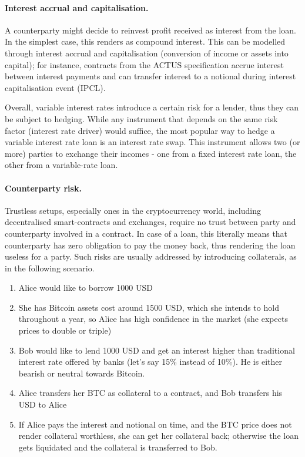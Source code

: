 \documentclass[runningheads]{llncs}
\begin{document}
\paragraph*{Interest accrual and capitalisation. }

A counterparty might decide to reinvest profit received as interest
from the %
loan. In the simplest case, this renders as compound
interest. This can be modelled through interest accrual and capitalisation (conversion of income or assets into capital);
for instance, contracts from the ACTUS specification accrue interest
between interest payments and can transfer interest to a notional
during interest capitalisation event (IPCL).

Overall, variable interest rates introduce a certain risk for a lender,
thus they can be %
subject to hedging. While any instrument that depends
on the same risk factor (interest rate driver) would suffice, the
most popular way to hedge a variable interest rate loan is an interest
rate swap. This instrument allows two (or more) parties to exchange
their incomes - one from a fixed interest rate loan, the other from a variable-rate loan.

\paragraph*{Counterparty risk.}

Trustless setups, especially ones in the cryptocurrency world, including 
decentralised smart-contracts and exchanges, require no trust between
party and counterparty involved in a contract. In case of a loan,
this literally means that counterparty has zero obligation to pay
the money back, thus rendering the loan useless for a party. Such
risks are usually addressed by introducing collaterals, as in the following scenario. 
\begin{enumerate}
\item Alice would like to borrow 1000 USD 
\item She has Bitcoin assets cost around 1500 USD, which she intends to
hold throughout a year, so Alice has high confidence in the market
(she expects prices to double or triple) 
\item Bob would like to lend 1000 USD and get an interest higher than traditional
interest rate offered by banks (let's say 15\% instead of 10\%). He
is either bearish or neutral towards Bitcoin. 
\item Alice transfers her BTC as collateral to a contract, and Bob transfers
his USD to Alice 
\item If Alice pays the interest and notional on time, and the BTC price does not
render collateral worthless, she can get her collateral back; otherwise
the loan gets liquidated and the collateral is transferred to Bob. 
\end{enumerate}
\end{document}
